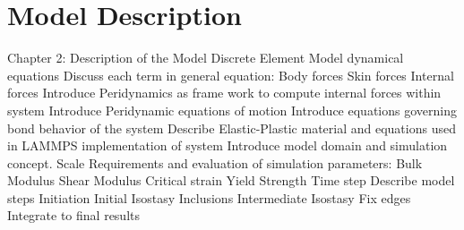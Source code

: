 \chapter{Model Description}\label{ch:modeldescription}
\begin{outline}[enumerate]
\1 Chapter 2: Description of the Model
\2 Discrete Element Model dynamical equations
\3 Discuss each term in general equation:
\4 Body forces
\4 Skin forces
\4 Internal forces
\3 Introduce Peridynamics as frame work to compute internal forces within system
\4 Introduce Peridynamic equations of motion
\4 Introduce equations governing bond behavior of the system
\4 Describe Elastic-Plastic material and equations used in LAMMPS implementation of system
\3 Introduce model domain and simulation concept.
\4 Scale Requirements and evaluation of simulation parameters:
\4 Bulk Modulus
\4 Shear Modulus
\4 Critical strain
\4 Yield Strength
\4 Time step
\3 Describe model steps
\4 Initiation
\4 Initial Isostasy
\4 Inclusions
\4 Intermediate Isostasy
\4 Fix edges
\4 Integrate to final results
\end{outline}
